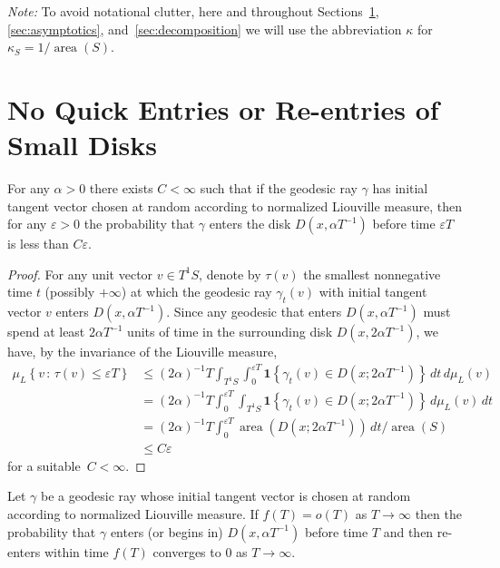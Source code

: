 \documentclass[AHL, Unicode, longabstracts, published]{cedram}
\newcommand{\xset}[1]{\left\{ #1 \right\}}
\DeclareMathOperator{\area}{area}
\begin{document}
\noindent
\emph{Note:} To avoid notational clutter, here and throughout Sections~\ref{sec:no-prefixes},\ref{sec:asymptotics}, and~\ref{sec:decomposition} we will use the abbreviation $\kappa$ for $\kappa_{S}=1/\area(S)$.


\section{No Quick Entries or Re-entries of Small Disks}\label{sec:no-prefixes}



\begin{prop}\label{proposition:no-quick-entries}
For any $\alpha>0$ there exists $C<\infty$ such that if the geodesic ray $\gamma$ has initial tangent vector chosen at random according to normalized Liouville measure, then for any $\varepsilon>0$ the probability that $\gamma$ enters the disk $D(x,\alpha T^{-1})$ before time $\varepsilon T$ is less than $C \varepsilon$.
\end{prop}

\begin{proof}
For any unit vector $v \in T^{1}S$, denote by $\tau (v)$ the smallest nonnegative time $t$ (possibly $+\infty$) at which the geodesic ray $\gamma_{t}(v)$ with initial tangent vector $v$ enters $D(x,\alpha T^{-1})$. Since any geodesic that enters $D(x, \alpha T^{-1})$ must spend at least $2\alpha T^{-1}$ units of time in the surrounding disk $D(x, 2 \alpha T^{-1})$, we have, by the invariance of the Liouville measure,
\begin{align*}
\mu_{L} \xset {v\,:\, \tau (v)\leq \varepsilon T}&\leq (2\alpha)^{-1}T\int_{T^{1}S} \int_{0}^{\varepsilon T}\mathbf{1} \xset { \gamma_{t}(v)\in D(x;2\alpha T^{-1}) }\, dt \, d\mu_{L}(v) \\
&= (2\alpha)^{-1}T \int_{0}^{\varepsilon T} \int_{T^{1}S} \mathbf{1} \xset { \gamma_{t}(v)\in D(x;2\alpha T^{-1}) }\, d \mu_{L}(v) \,dt \\
&= (2\alpha)^{-1}T \int_{0}^{\varepsilon T} \area \left(D(x;2\alpha T^{-1})\right) \, dt/ \area(S)\\
& \leq C \varepsilon
\end{align*}
for a suitable~$C< \infty$.
\end{proof}


\goodbreak
\begin{prop}\label{proposition:no-quick-returns}
Let $\gamma$ be a geodesic ray whose initial tangent vector is chosen at random according to normalized Liouville measure. If $f(T)=o(T)$ as $T \rightarrow \infty$ then the probability that $\gamma$ enters (or begins in) $D(x,\alpha T^{-1})$ before time $T$ and then re-enters within time $f(T)$ converges to $0$ as $T \rightarrow \infty$.
\end{prop}
\end{document}
